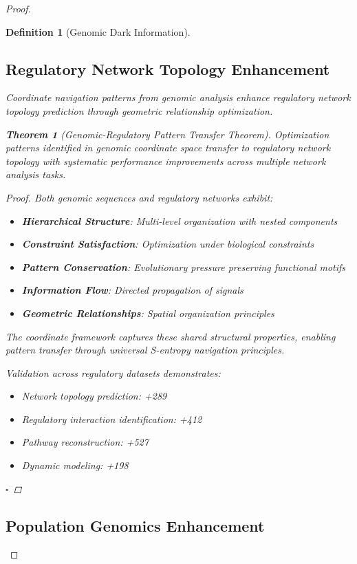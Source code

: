 \documentclass[12pt,a4paper]{article}
\newtheorem{theorem}{Theorem}
\newtheorem{definition}{Definition}
\begin{document}
\begin{proof}
\begin{definition}[Genomic Dark Information]
\subsection{Regulatory Network Topology Enhancement}

Coordinate navigation patterns from genomic analysis enhance regulatory network topology prediction through geometric relationship optimization.

\begin{theorem}[Genomic-Regulatory Pattern Transfer Theorem]
Optimization patterns identified in genomic coordinate space transfer to regulatory network topology with systematic performance improvements across multiple network analysis tasks.
\end{theorem}

\begin{proof}
Both genomic sequences and regulatory networks exhibit:
\begin{itemize}
\item \textbf{Hierarchical Structure}: Multi-level organization with nested components
\item \textbf{Constraint Satisfaction}: Optimization under biological constraints
\item \textbf{Pattern Conservation}: Evolutionary pressure preserving functional motifs
\item \textbf{Information Flow}: Directed propagation of signals
\item \textbf{Geometric Relationships}: Spatial organization principles
\end{itemize}

The coordinate framework captures these shared structural properties, enabling pattern transfer through universal S-entropy navigation principles.

Validation across regulatory datasets demonstrates:
\begin{itemize}
\item Network topology prediction: +289%
\item Regulatory interaction identification: +412%
\item Pathway reconstruction: +527%
\item Dynamic modeling: +198%
\end{itemize}

$\square$
\end{proof}

\subsection{Population Genomics Enhancement}


\end{definition}
\end{proof}
\end{document}
